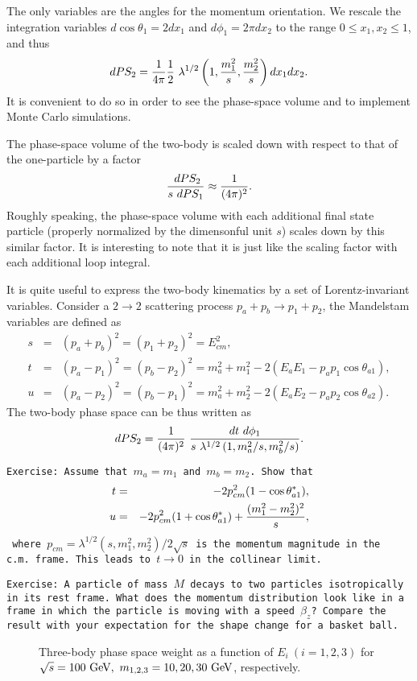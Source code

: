 \documentclass[prd,aps,floats,preprintnumbers,preprint,superscriptaddress,floatfix,nofootinbib]{revtex4}
\def\gev{{\rm GeV}}
\def\be{\begin{equation}}
\def\ee{\end{equation}}
\def\bea{\begin{eqnarray}}
\def\eea{\end{eqnarray}}
\begin{document}
The only variables are the angles for the momentum orientation.
We  rescale the integration variables $d\cos\theta_1=2dx_1$
and $d\phi_1=2\pi dx_2$ to the range $0\le x_1, x_2 \le 1$, and thus
\bea
dPS_2  = {1\over 4\pi}{1\over 2}\ 
\lambda^{1/2}\left(1,{m_1^2\over s},{m_2^2\over s}\right) 
dx_1 dx_2.
\eea
It is convenient to do so in order 
to see the phase-space volume and to implement Monte Carlo simulations.

The phase-space volume of the two-body is scaled down 
with respect to that of the one-particle by a factor 
\be
{ \ dPS_2\over s\ dPS_1} \approx {1\over (4\pi)^2} .
\ee
Roughly speaking, the phase-space volume with each additional
final state particle (properly normalized by the dimensonful
unit $s$) scales down by this similar factor. It is interesting
to note that it is just like the scaling factor with each
additional loop integral.

It is quite useful to express the two-body kinematics by a set
of Lorentz-invariant variables.
Consider a $2\to 2$ scattering process $p_a + p_b\to p_1 + p_2$, 
the Mandelstam variables are defined as
\bea
\nonumber
s&=&(p_a+p_b)^2=(p_1+p_2)^2=E^2_{cm},\\
t&=&(p_a-p_1)^2=(p_b-p_2)^2=m_a^2+m_1^2-2(E_a E_1-p_ap_1\cos\theta_{a1}) ,\\
\nonumber
u&=&(p_a-p_2)^2=(p_b-p_1)^2=m_a^2+m_2^2-2(E_a E_2-p_ap_2\cos\theta_{a2}).
\eea
The two-body phase space can be thus written as
\be
dPS_2 = {1\over (4\pi)^2}\ 
{dt\ d\phi_1
\over s\ \lambda^{1/2}\left(1,{m_a^2/s},{m_b^2/ s}\right)}.
\ee

\noindent
{\tt Exercise: Assume that $m_a=m_1$ and  $m_b=m_2$. Show that 
\bea
\nonumber
t&=& -2 p_{cm}^2 (1- \cos\theta^*_{a1}) ,\\
\nonumber
u&=& -2 p_{cm}^2 (1+ \cos\theta^*_{a1}) + {(m_1^2-m_2^2)^2\over s},
\eea
where $p_{cm}=\lambda^{1/2}(s,m_1^2,m_2^2)/2\sqrt s$ is the momentum 
magnitude in the\\
 c.m.~frame.  This leads to $t\to 0$ in the collinear limit.}

\vskip 0.3cm
\noindent
{\tt Exercise: A particle of mass $M$ decays to two particles 
isotropically in its rest frame. What does the momentum distribution look
like in a frame in which the particle is moving with a speed $\beta_z$?
Compare the result with your expectation for the shape change for a
basket ball.
}

\begin{center}
\begin{figure}[tb]
\caption{Three-body phase space weight as a function of $E_i\ (i=1,2,3)$
for $\sqrt s=100\ \gev,\ m_{1,2,3}=10,20,30\ \gev$, respectively.
\label{3body}}
\end{figure}
\end{center}
\end{document}
